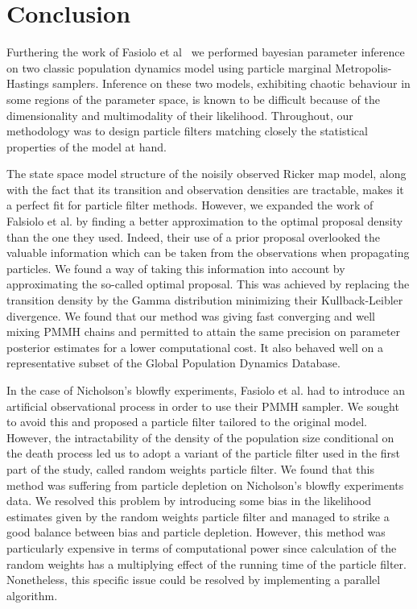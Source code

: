 \documentclass[12pt]{article}
\begin{document}
\clearpage	
	\section{Conclusion}
	Furthering the work of Fasiolo et al~\cite{fasiolo2014statistical} we performed bayesian parameter inference on two classic population dynamics model using particle marginal Metropolis-Hastings samplers. Inference on these two models, exhibiting chaotic behaviour in some regions of the parameter space, is known to be difficult because of the dimensionality and multimodality of their likelihood. Throughout, our methodology was to design particle filters matching closely the statistical properties of the model at hand.
	
	The state space model structure of the noisily observed Ricker map model, along with the fact that its transition and observation densities are tractable, makes it a perfect fit for particle filter methods. However, we expanded the work of Falsiolo et al. by finding a better approximation to the optimal proposal density than the one they used. Indeed, their use of a prior proposal overlooked the valuable information which can be taken from the observations when propagating particles. We found a way of taking this information into account by approximating the so-called optimal proposal. This was achieved by replacing the transition density by the Gamma distribution minimizing their Kullback-Leibler divergence. We found that our method was giving fast converging and well mixing PMMH chains and permitted to attain the same precision on parameter posterior estimates for a lower computational cost. It also behaved well on a representative subset of the Global Population Dynamics Database.
	
	In the case of Nicholson's blowfly experiments, Fasiolo et al. had to introduce an artificial observational process in order to use their PMMH sampler. We sought to avoid this and proposed a particle filter tailored to the original model. However, the intractability of the density of the population size conditional on the death process led us to adopt a variant of the particle filter used in the first part of the study, called random weights particle filter. We found that this method was suffering from particle depletion on Nicholson's blowfly experiments data. We resolved this problem by introducing some bias in the likelihood estimates given by the random weights particle filter and managed to strike a good balance between bias and particle depletion. However, this method was particularly expensive in terms of computational power since calculation of the random weights has a multiplying effect of the running time of the particle filter. Nonetheless, this specific issue could be resolved by implementing a parallel algorithm.
	
\end{document}
